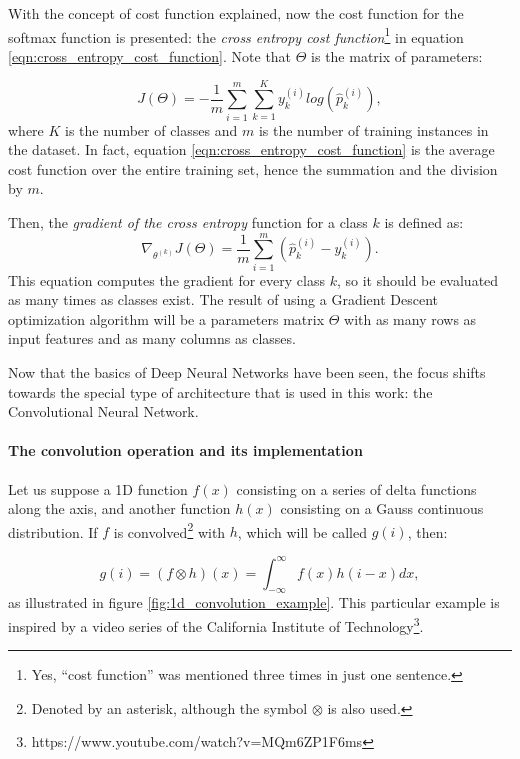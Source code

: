 \documentclass[../main.tex]{subfiles}
\begin{document}
With the concept of cost function explained, now the cost function for the softmax function is presented: the \textit{cross entropy cost function}\footnote{Yes, ``cost function'' was mentioned three times in just one sentence.} in equation \ref{eqn:cross_entropy_cost_function}. Note that $\Theta$ is the matrix of parameters:

\begin{equation} \label{eqn:cross_entropy_cost_function}
    J(\Theta) = -\frac{1}{m} \sum_{i=1}^{m} \sum_{k=1}^{K} y_k^{(i)}log\left(\hat{p}_k^{(i)}\right),
\end{equation}
where $K$ is the number of classes and $m$ is the number of training instances in the dataset. In fact, equation \ref{eqn:cross_entropy_cost_function} is the average cost function over the entire training set, hence the summation and the division by $m$.

Then, the \textit{gradient of the cross entropy} function for a class $k$ is defined as:
\begin{equation} \label{eqn:cross_entropy_gradient_function}
    \nabla_{\theta^{(k)}} J(\Theta) = \frac{1}{m} \sum_{i=1}^{m} \left(\hat{p}_k^{(i)} -  y_k^{(i)}\right).
\end{equation}
This equation  computes the gradient for every class $k$, so it should be evaluated as many times as classes exist. The result of using a Gradient Descent optimization algorithm will be a parameters matrix $\Theta$ with as many rows as input features and as many columns as classes.

Now that the basics of Deep Neural Networks have been seen, the focus shifts towards the special type of architecture that is used in this work: the Convolutional Neural Network.

\paragraph{The convolution operation and its implementation}
Let us suppose a 1D function $f(x)$ consisting on a series of delta functions along the axis, and another function $h(x)$ consisting on a Gauss continuous distribution. If $f$ is convolved\footnote{Denoted by an asterisk, although the symbol $\otimes$ is also used.} with $h$, which will be called $g(i)$, then:

\begin{equation} \label{eqn:1D_conv_cont}
    g(i) = (f \otimes h)(x) = \int_{-\infty}^{\infty} f(x) h(i-x) dx,
\end{equation}
as illustrated in figure \ref{fig:1d_convolution_example}. This particular example is inspired by a video series of the California Institute of Technology\footnote{https://www.youtube.com/watch?v=MQm6ZP1F6ms}.
\end{document}
